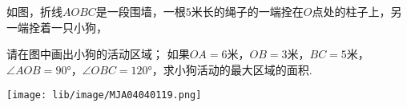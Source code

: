 如图，折线$AOBC$是一段围墙，一根$5$米长的绳子的一端拴在$O$点处的柱子上，另一端拴着一只小狗，

\begin{subquestions}
    \subquestion 请在图中画出小狗的活动区域；
    \subquestion 如果$OA = 6$米，$OB = 3$米，$BC = 5$米，$∠AOB = 90°$，$∠OBC = 120°$，求小狗活动的最大区域的面积.

\end{subquestions}
\begin{center}
    \texttt{[image: lib/image/MJA04040119.png]}
\end{center}